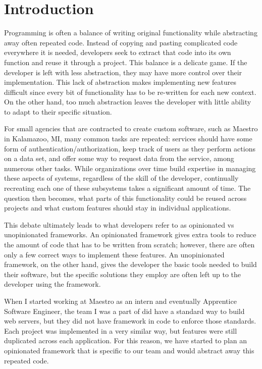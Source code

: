 \section{Introduction}

Programming is often a balance of writing original functionality while abstracting away often repeated code.  Instead of copying and pasting complicated code everywhere it is needed, developers seek to extract that code into its own function and reuse it through a project. This balance is a delicate game.  If the developer is left with less abstraction, they may have more control over their implementation. This lack of abstraction makes implementing new features difficult since every bit of functionality has to be re-written for each new context.  On the other hand, too much abstraction leaves the developer with little ability to adapt to their specific situation.

For small agencies that are contracted to create custom software, such as Maestro in Kalamazoo, MI, many common tasks are repeated:  services should have some form of authentication/authorization, keep track of users as they perform actions on a data set, and offer some way to request data from the service, among numerous other tasks.  While organizations over time build expertise in managing these aspects of systems, regardless of the skill of the developer, continually recreating each one of these subsystems takes a significant amount of time.  The question then becomes, what parts of this functionality could be reused across projects and what custom features should stay in individual applications.

This debate ultimately leads to what developers refer to as opinionated vs unopinionated frameworks.  An opinionated framework gives extra tools to reduce the amount of code that has to be written from scratch; however, there are often only a few correct ways to implement these features.  An unopinionated framework, on the other hand, gives the developer the basic tools needed to build their software, but the specific solutions they employ are often left up to the developer using the framework.

When I started working at Maestro as an intern and eventually Apprentice Software Engineer, the team I was a part of did have a standard way to build web servers, but they did not have framework in code to enforce those standards.  Each project was implemented in a very similar way, but features were still duplicated across each application.  For this reason, we have started to plan an opinionated framework that is specific to our team and would abstract away this repeated code.

